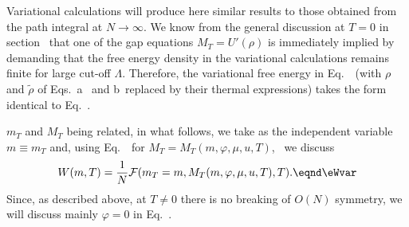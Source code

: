 Variational calculations will produce here similar results to
those obtained from the path integral at $N \to \infty$.
We know from the general discussion at $T=0$ in section
\ssSUSYNvar\ that one of the gap equations $M_T=U'(\rho)$ is
immediately implied by demanding that the free energy density in
the variational calculations remains finite for large cut-off
$\Lambda $. Therefore, the variational free energy in Eq.~\eVarEsusy\
 (with $\rho$ and $\tilde \rho$  of Eqs.~\eR a ~and
 \eR b~replaced by their thermal expressions) takes the form  identical
to Eq.~\FreeEnergy.


$m_T$ and $M_T$ being related, in what follows,  we take as the
independent variable $m\equiv m_T$ and, using Eq.~\FermionMassi\
for $M_T=M_T(m,\varphi,\mu,u,T)$, ~we discuss
$$W(m,T)={1\over N}{\cal F}
(m_T=m,M_T(m,\varphi,\mu,u,T),T).\eqnd\eWvar$$
Since, as described above, at $T\neq 0$ there is no breaking of
 $O(N)$ symmetry, we will discuss mainly $\varphi=0$ in
Eq.~\eWvar.





